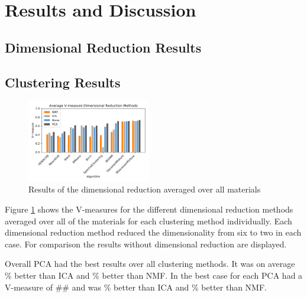\documentclass[a4paper,11pt]{article}
\begin{document}

\section{Results and Discussion}

\subsection{Dimensional Reduction Results}

\subsection{Clustering Results}

\begin{figure}
  
  \begin{center}
    \includegraphics[width=0.48\textwidth]{figures/red_methods.png}
  \end{center}
  
  \caption{Results of the dimensional reduction averaged over all materials}
  
  \label{results:dr}
\end{figure}

Figure \ref{results:dr} shows the V-measures for the different dimensional reduction methods averaged over all of the materials for each clustering method individually. Each dimensional reduction method reduced the dimensionality from six to two in each case. For comparison the results without dimensional reduction are displayed.

Overall PCA had the best results over all clustering methods. It was on average \% better than ICA and \% better than NMF. In the best case for each PCA had a V-measure of \#\# and was \% better than ICA and \% better than NMF.
\end{document}
